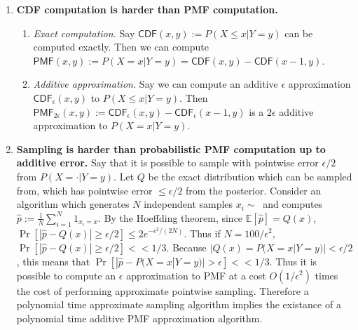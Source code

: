 \documentclass{article}
\theoremstyle{definition}
\theoremstyle{remark}
\begin{document}
\begin{enumerate}
    \item \textbf{CDF computation is harder than PMF computation.} 
        \begin{enumerate}
            \item \textit{Exact computation.} Say $\mathsf{CDF}(x, y) := P(X \leq x | Y = y)$ can be computed exactly.  Then we can compute $\mathsf{PMF}(x, y) := P(X = x | Y = y) = \mathsf{CDF}(x, y) - \mathsf{CDF}(x - 1, y)$.
            \item \textit{Additive approximation.} Say we can compute an additive $\epsilon$ approximation $\mathsf{CDF}_\epsilon(x, y)$ to $P(X \leq x | Y = y)$. Then $\mathsf{PMF}_{2\epsilon}(x, y) := \mathsf{CDF}_\epsilon(x, y) - \mathsf{CDF}_\epsilon(x-1, y)$ is a $2\epsilon$ additive approximation to $P(X = x | Y = y)$.
        \end{enumerate}
    \item \textbf{Sampling is harder than probabilistic PMF computation up to additive error.} Say that it is possible to sample with pointwise error $\epsilon / 2$ from $P(X = \cdot | Y = y)$. Let $Q$ be the exact distribution which can be sampled from, which has pointwise error $\leq \epsilon / 2$ from the posterior.  Consider an algorithm which generates $N$ independent samples $x_i \sim ~$ and computes $\hat{p} := \frac{1}{N} \sum_{i=1}^N 1_{x_i = x}$.
    By the Hoeffding theorem, since $\mathbb{E}[\hat{p}] = Q(x)$, $\Pr[|\hat{p} - Q(x)| \geq \epsilon / 2] \leq 2e^{-\epsilon^2/(2N)}$. Thus if $N = 100/\epsilon^2$, $\Pr[|\hat{p} - Q(x)| \geq \epsilon / 2] << 1/3$.
    Because $|Q(x) = P(X = x | Y = y)| < \epsilon/2$, this means that
    $\Pr[|\hat{p} - P(X = x | Y = y)| > \epsilon] << 1/3$.
    Thus it is possible to compute an $\epsilon$ approximation to PMF at a cost $O(1/\epsilon^2)$ times the cost of performing approximate pointwise sampling.
    Therefore a polynomial time approximate sampling algorithm implies the existance of a polynomial time additive PMF approximation algorithm.
\end{enumerate}

\end{document}
